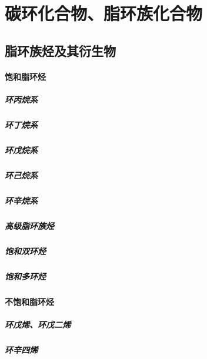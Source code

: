 \documentclass[UTF8]{../03-Chemistry}
\begin{document}
\chapter{碳环化合物、脂环族化合物}
\section{脂环族烃及其衍生物}
    \subsubsection{饱和脂环烃}
        \paragraph{环丙烷系}
        \paragraph{环丁烷系}
        \paragraph{环戊烷系}
        \paragraph{环己烷系}
        \paragraph{环辛烷系}
        \paragraph{高级脂环族烃}
        \paragraph{饱和双环烃}
        \paragraph{饱和多环烃}
    \subsubsection{不饱和脂环烃}
        \paragraph{环戊烯、环戊二烯}
        \paragraph{环辛四烯}
\end{document}
